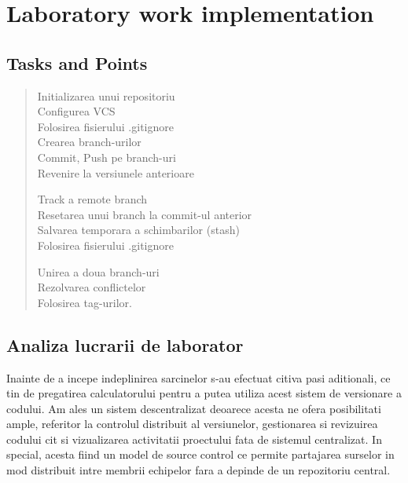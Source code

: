 \section{Laboratory work implementation}

\subsection{Tasks and Points}

\begin{quote}
\begin{description}

	Initializarea unui repositoriu \\
	Configurea VCS\\
	Folosirea fisierului .gitignore\\
	Crearea branch-urilor\\
	Commit, Push pe branch-uri\\
	Revenire la versiunele anterioare
	
	Track a remote branch\\
	Resetarea unui branch la commit-ul anterior\\
	Salvarea temporara a schimbarilor (stash)\\
	Folosirea fisierului .gitignore
		
	Unirea a doua branch-uri\\
	Rezolvarea conflictelor\\
	Folosirea tag-urilor.

\end{description}
\end{quote}

\subsection{Analiza lucrarii de laborator}

Inainte de a incepe indeplinirea sarcinelor s-au efectuat citiva pasi aditionali, ce tin de pregatirea calculatorului pentru a putea utiliza acest sistem de versionare a codului. Am ales un sistem descentralizat deoarece acesta ne ofera posibilitati ample, referitor la controlul distribuit al versiunelor, gestionarea si revizuirea codului cit si vizualizarea activitatii proectului fata de sistemul centralizat. In special, acesta fiind un model de source control ce permite partajarea surselor in mod distribuit intre membrii echipelor fara a depinde de un repozitoriu central.

\begin{flushleft} %
\end{flushleft}

